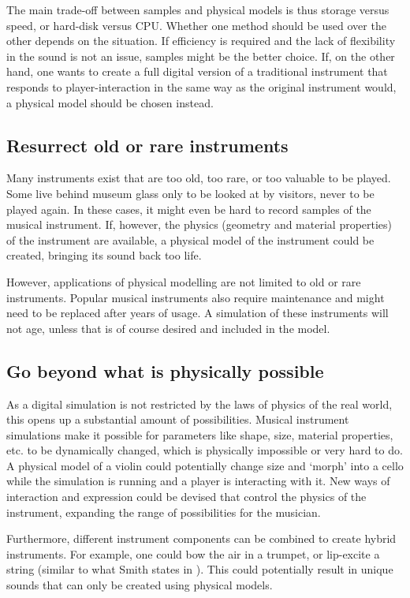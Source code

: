 The main trade-off between samples and physical models is thus storage versus speed, or hard-disk versus CPU. Whether one method should be used over the other depends on the situation. If efficiency is required and the lack of flexibility in the sound is not an issue, samples might be the better choice. If, on the other hand, one wants to create a full digital version of a traditional instrument that responds to player-interaction in the same way as the original instrument would, a physical model should be chosen instead.

\subsection{Resurrect old or rare instruments}
Many instruments exist that are too old, too rare, or too valuable to be played. Some live behind museum glass only to be looked at by visitors, never to be played again. In these cases, it might even be hard to record samples of the musical instrument. If, however, the physics (geometry and material properties) of the instrument are available, a physical model of the instrument could be created, bringing its sound back too life.

However, applications of physical modelling are not limited to old or rare instruments. Popular musical instruments also require maintenance and might need to be replaced after years of usage. A simulation of these instruments will not age, unless that is of course desired and included in the model.

\subsection{Go beyond what is physically possible}\label{sec:impossible}
As a digital simulation is not restricted by the laws of physics of the real world, this opens up a substantial amount of possibilities.
Musical instrument simulations make it possible for parameters like shape, size, material properties, etc. to be dynamically changed, which is physically impossible or very hard to do. A physical model of a violin could potentially change size and `morph' into a cello while the simulation is running and a player is interacting with it. New ways of interaction and expression could be devised that control the physics of the instrument, expanding the range of possibilities for the musician. 

Furthermore, different instrument components can be combined to create hybrid instruments. For example, one could bow the air in a trumpet, or lip-excite a string (similar to what Smith states in \cite{Smith2010a}). This could potentially result in unique sounds that can only be created using physical models.

